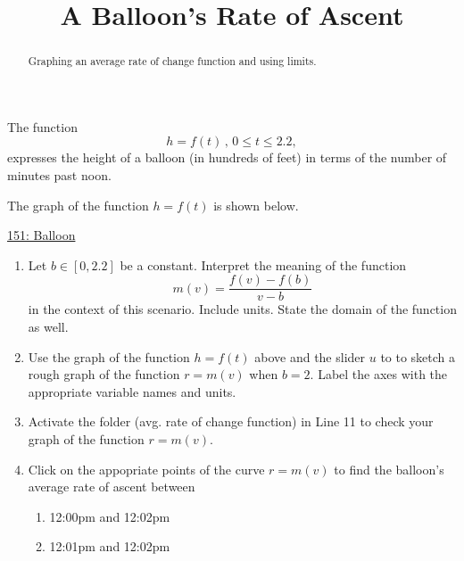 \documentclass{ximera}
\title{A Balloon's Rate of Ascent}
\begin{document}
\begin{abstract}
Graphing an average rate of change function and using limits.
\end{abstract}
\maketitle




\begin{question}  \label{Q4gdfeft4tr4}
The function
\[
      h = f(t)  \, , \, 0\leq t \leq 2.2 ,                     %
\]
expresses the height of a balloon (in hundreds of feet) in terms of the number of minutes past noon.

The graph of the function $h=f(t)$ is shown below.

\begin{onlineOnly}
    \begin{center}
\end{center}
\end{onlineOnly}

\href{https://www.desmos.com/calculator/yd4xm6x6ub}{151: Balloon}

\begin{enumerate}

\item Let $b\in [0,2.2]$ be a constant. Interpret the meaning of the function
\[
   m(v) =  \frac{f(v)-f(b)}{v-b}
\]
in the context of this scenario. Include units. State the domain of the function as well.

\item Use the graph of the function $h=f(t)$ above and the slider $u$ to to sketch a rough graph of the function $r=m(v)$ when $b=2$. Label the axes with the appropriate variable names and units.

\item Activate the folder (avg. rate of change function) in Line 11 to check your graph of the function $r=m(v)$. 

\item Click on the appopriate points of the curve $r=m(v)$ to find the balloon's average rate of ascent between 

\begin{enumerate}
\item 12:00pm and 12:02pm

\item 12:01pm and 12:02pm
\end{enumerate}


\end{enumerate}
\end{question}
\end{document}
